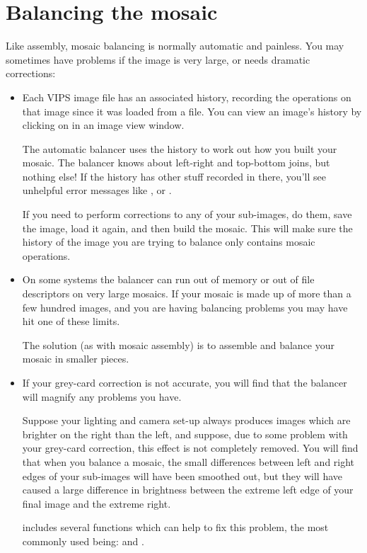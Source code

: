 \section{Balancing the mosaic}

Like assembly, mosaic balancing is normally automatic and painless. You may
sometimes have problems if the image is very large, or needs dramatic
corrections:

\begin{itemize}

\item
Each VIPS image file has an associated history, recording the operations on
that image since it was loaded from a file. You can view an image's history
by clicking on  in an image view window.

The automatic balancer uses the history to work out how you built your
mosaic. The balancer knows about left-right and top-bottom joins, but nothing
else! If the history has other stuff recorded in there, you'll see
unhelpful error messages like , or .

If you need to perform corrections to any of your sub-images, do them, save
the image, load it again, and then build the mosaic. This will make sure the
history of the image you are trying to balance only contains mosaic
operations.

\item
On some systems the balancer can run out of memory or out of file descriptors
on very large mosaics. If your mosaic is made up of more than a few hundred
images, and you are having balancing problems you may have hit one
of these limits.

The solution (as with mosaic assembly) is to assemble and balance your mosaic
in smaller pieces.

\item
If your grey-card correction is not accurate, you will find that the
balancer will magnify any problems you have. 

Suppose your lighting and camera set-up always produces images which are
brighter on the right than the left, and suppose, due to some problem with
your grey-card correction, this effect is not completely removed. You will
find that when you balance a mosaic, the small differences between left and
right edges of your sub-images will have been smoothed out, but they will have
caused a large difference in brightness between the extreme left edge of your
final image and the extreme right.

\nip{} includes several functions which can help to fix this problem, the
most commonly used being:  and .

\end{itemize}


